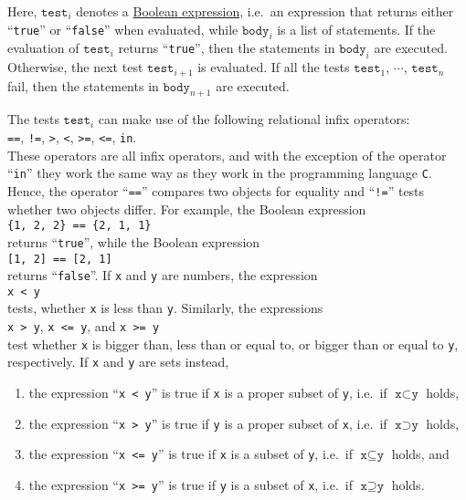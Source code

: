 Here,  $\texttt{test}_i$ denotes a \href{https://en.wikipedia.org/wiki/Boolean_expression}{Boolean expression}, 
i.e.~an expression that returns either ``\texttt{true}'' or ``\texttt{false}'' when evaluated, while
$\texttt{body}_i$ is a list of statements.  If the
evaluation of $\texttt{test}_i$ returns ``\texttt{true}'', then the statements in $\texttt{body}_i$ are
executed.  Otherwise, the next test $\texttt{test}_{i+1}$ is evaluated.  If all the tests $\texttt{test}_1$, $\cdots$, $\texttt{test}_n$ 
fail, then the statements in $\texttt{body}_{n+1}$ are executed.
 
The tests $\texttt{test}_i$ can make use of the following relational infix operators:
\\[0.2cm]
\hspace*{1.3cm}
\texttt{==}, \quad
\texttt{!=}, \quad
\texttt{>},  \quad
\texttt{<},  \quad
\texttt{>=}, \quad
\texttt{<=}, \quad
\texttt{in}. \quad
\\[0.2cm]
These operators are all infix operators, and with the exception of the operator ``\texttt{in}'' they work the
same way as they work in the programming language \texttt{C}.  Hence,
the operator ``\texttt{==}'' compares two objects for equality and ``\texttt{!=}'' tests whether two objects
differ.  For example, the Boolean expression
\\[0.2cm]
\hspace*{1.3cm}
\texttt{\{1, 2, 2\} == \{2, 1, 1\}}
\\[0.2cm]
returns ``\texttt{true}'', while the Boolean expression
\\[0.2cm]
\hspace*{1.3cm}
\texttt{[1, 2] == [2, 1]}
\\[0.2cm]
returns ``\texttt{false}''.  If \texttt{x} and \texttt{y} are numbers, the expression
\\[0.2cm]
\hspace*{1.3cm}
\texttt{x < y}
\\[0.2cm]
tests, whether \texttt{x} is less than \texttt{y}.  Similarly, the expressions
\\[0.2cm]
\hspace*{1.3cm}
\texttt{x > y}, \quad \texttt{x <= y}, \quad and \quad \texttt{x >= y}
\\[0.2cm]
test whether \texttt{x} is bigger than, less than or equal to, or bigger than or equal to \texttt{y}, respectively.
If \texttt{x} and \texttt{y} are sets instead, 
\begin{enumerate}
\item the expression ``\texttt{x < y}'' is true if \texttt{x} is a proper subset of \texttt{y}, 
      i.e.~if $\texttt{x} \subset \texttt{y}$ holds,
\item the expression ``\texttt{x > y}'' is true if \texttt{y} is a proper subset of \texttt{x},
      i.e.~if $\texttt{x} \supset \texttt{y}$ holds,
\item the expression ``\texttt{x <= y}'' is true if \texttt{x} is a subset of \texttt{y},
      i.e.~if $\texttt{x} \subseteq \texttt{y}$ holds, \quad and
\item the expression ``\texttt{x >= y}'' is true if \texttt{y} is a subset of \texttt{x},
      i.e.~if $\texttt{x} \supseteq \texttt{y}$ holds.
\end{enumerate}
